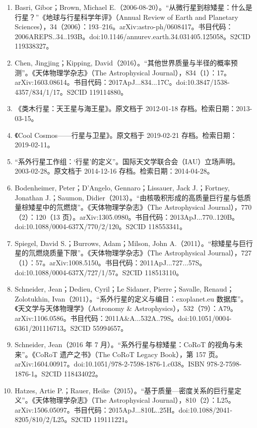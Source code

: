 \begin{enumerate}
\item Basri, Gibor；Brown, Michael E.（2006-08-20）。“从微行星到棕矮星：什么是行星？”《地球与行星科学年评》（Annual Review of Earth and Planetary Sciences），34（2006）：193–216。arXiv:astro-ph/0608417。书目代码：2006AREPS..34..193B。doi:10.1146/annurev.earth.34.031405.125058。S2CID 119338327。
\item Chen, Jingjing；Kipping, David（2016）。“其他世界质量与半径的概率预测”。《天体物理学杂志》（The Astrophysical Journal），834（1）：17。arXiv:1603.08614。书目代码：2017ApJ...834...17C。doi:10.3847/1538-4357/834/1/17。S2CID 119114880。
\item 《类木行星：天王星与海王星》。原文档于 2012-01-18 存档。检索日期：2013-03-15。
\item 《Cool Cosmos——行星与卫星》。原文档于 2019-02-21 存档。检索日期：2019-02-11。
\item “系外行星工作组：‘行星’的定义”。国际天文学联合会（IAU）立场声明。2003-02-28。原文档于 2014-12-16 存档。检索日期：2014-04-28。
\item Bodenheimer, Peter；D’Angelo, Gennaro；Lissauer, Jack J.；Fortney, Jonathan J.；Saumon, Didier（2013）。“由核吸积形成的高质量巨行星与低质量棕矮星中的氘燃烧”。《天体物理学杂志》（The Astrophysical Journal），770（2）：120（13 页）。arXiv:1305.0980。书目代码：2013ApJ...770..120B。doi:10.1088/0004-637X/770/2/120。S2CID 118553341。
\item Spiegel, David S.；Burrows, Adam；Milson, John A.（2011）。“棕矮星与巨行星的氘燃烧质量下限”。《天体物理学杂志》（The Astrophysical Journal），727（1）：57。arXiv:1008.5150。书目代码：2011ApJ...727...57S。doi:10.1088/0004-637X/727/1/57。S2CID 118513110。
\item Schneider, Jean；Dedieu, Cyril；Le Sidaner, Pierre；Savalle, Renaud；Zolotukhin, Ivan（2011）。“系外行星的定义与编目：exoplanet.eu 数据库”。《天文学与天体物理学》（Astronomy & Astrophysics），532（79）：A79。arXiv:1106.0586。书目代码：2011A&A...532A..79S。doi:10.1051/0004-6361/201116713。S2CID 55994657。
\item Schneider, Jean（2016 年 7 月）。“系外行星与棕矮星：CoRoT 的视角与未来”。《CoRoT 遗产之书》（The CoRoT Legacy Book），第 157 页。arXiv:1604.00917。doi:10.1051/978-2-7598-1876-1.c038。ISBN 978-2-7598-1876-1。S2CID 118434022。
\item Hatzes, Artie P.；Rauer, Heike（2015）。“基于质量—密度关系的巨行星定义”。《天体物理学杂志》（The Astrophysical Journal），810（2）：L25。arXiv:1506.05097。书目代码：2015ApJ...810L..25H。doi:10.1088/2041-8205/810/2/L25。S2CID 119111221。

\end{enumerate}
